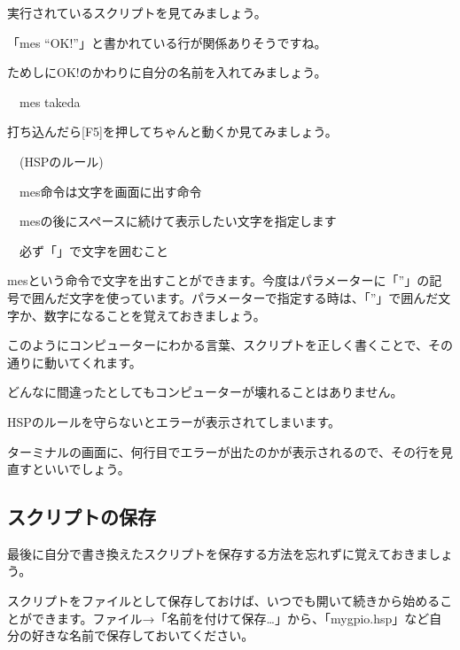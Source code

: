 \documentclass[a4paper,12pt]{jarticle}
\begin{document}
\bigskip
\bigskip
\bigskip

実行されているスクリプトを見てみましょう。

「mes “OK!”」と書かれている行が関係ありそうですね。

ためしに{\textquotedbl}OK!{\textquotedbl}のかわりに自分の名前を入れてみましょう。


\bigskip

\ \ mes {\textquotedbl}takeda{\textquotedbl}


\bigskip

打ち込んだら[F5]を押してちゃんと動くか見てみましょう。


\bigskip

\ \ (HSPのルール)


\bigskip

\ \ mes命令は文字を画面に出す命令

\ \ mesの後にスペースに続けて表示したい文字を指定します

\ \ 必ず「{\textquotedbl}」で文字を囲むこと


\bigskip

mesという命令で文字を出すことができます。今度はパラメーターに「”」の記号で囲んだ文字を使っています。パラメーターで指定する時は、「”」で囲んだ文字か、数字になることを覚えておきましょう。


\bigskip

このようにコンピューターにわかる言葉、スクリプトを正しく書くことで、その通りに動いてくれます。

どんなに間違ったとしてもコンピューターが壊れることはありません。

HSPのルールを守らないとエラーが表示されてしまいます。

ターミナルの画面に、何行目でエラーが出たのかが表示されるので、その行を見直すといいでしょう。


\bigskip

\subsection{スクリプトの保存}
\bigskip
\bigskip

最後に自分で書き換えたスクリプトを保存する方法を忘れずに覚えておきましょう。

スクリプトをファイルとして保存しておけば、いつでも開いて続きから始めることができます。ファイル→「名前を付けて保存…」から、「mygpio.hsp」など自分の好きな名前で保存しておいてください。

\bigskip
\bigskip
\end{document}
